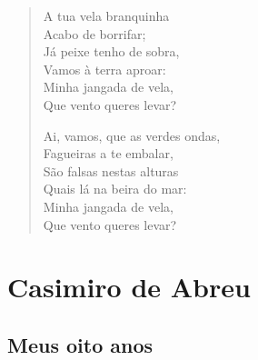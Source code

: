 \documentclass[10pt,a5paper,oneside]{book}
\begin{document}
\begin{verse}
A tua vela branquinha\\
Acabo de borrifar;\\
Já peixe tenho de sobra,\\
Vamos à terra aproar:\\
Minha jangada de vela,\\
Que vento queres levar?

Ai, vamos, que as verdes ondas,\\
Fagueiras a te embalar,\\
São falsas nestas alturas\\
Quais lá na beira do mar:\\
Minha jangada de vela,\\
Que vento queres levar?
\end{verse}

\part{Casimiro de Abreu}

\chapter{Meus oito anos}
\end{document}
